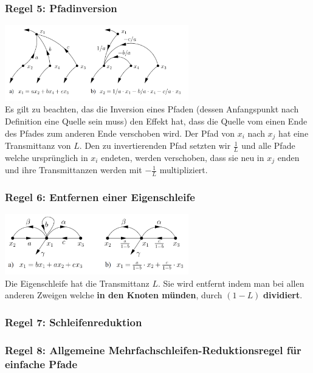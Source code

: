 \begin{multicols}{2}
	      \subsubsection{Regel 5: Pfadinversion}
	        \includegraphics[width=8cm]{./bilder/pfadinversion.png} \\
	        Es gilt zu beachten, das die Inversion eines Pfaden (dessen Anfangspunkt nach Definition
	        eine Quelle sein muss) den Effekt hat, dass die Quelle vom einen Ende des Pfades zum anderen
	        Ende verschoben wird. Der Pfad von $x_i$ nach $x_j$ hat eine Transmittanz von $L$. 
	        Den zu invertierenden Pfad setzten wir $\frac{1}{L}$ und alle Pfade welche ursprünglich in
	        $x_i$ endeten, werden verschoben, dass sie neu in $x_j$ enden und ihre Transmittanzen werden
	        mit $-\frac{1}{L}$ multipliziert.
	        
	      \subsubsection{Regel 6: Entfernen einer Eigenschleife}
	        \includegraphics[width=8cm]{./bilder/eigenschleife.png} \\
	        Die Eigenschleife hat die Transmittanz $L$. Sie wird entfernt indem man bei allen anderen
	        Zweigen welche \textbf{in den Knoten münden}, durch $(1-L)$ \textbf{dividiert}.
	        
	      \subsubsection{Regel 7: Schleifenreduktion }
	      
	      \subsubsection{Regel 8: Allgemeine Mehrfachschleifen-Reduktionsregel für einfache Pfade }
	       
	   \end{multicols}
	   
